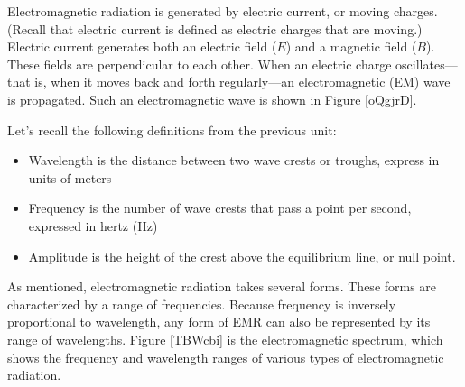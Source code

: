 \documentclass{article}
\numberwithin{equation}{section}
\numberwithin{figure}{section}
\begin{document}
\vspace{1em}

Electromagnetic radiation is generated by electric current, or moving charges. (Recall that electric current is defined as electric charges that are moving.) Electric current generates both an electric field ($E$) and a magnetic field ($B$). These fields are perpendicular to each other. When an electric charge oscillates---that is, when it moves back and forth regularly---an electromagnetic (EM) wave is propagated. Such an electromagnetic wave is shown in Figure \ref{oQgjrD}.

\begin{center}
    \captionsetup{type=figure,margin=1in,font=scriptsize}
    \label{oQgjrD}
\end{center}

Let's recall the following definitions from the previous unit:

\begin{itemize}
\setlength\itemsep{-0.5ex}
    \item Wavelength is the distance between two wave crests or troughs, express in units of meters
    \item Frequency is the number of wave crests that pass a point per second, expressed in hertz (Hz)
    \item Amplitude is the height of the crest above the equilibrium line, or null point.
\end{itemize}

As mentioned, electromagnetic radiation takes several forms. These forms are characterized by a range of frequencies. Because frequency is inversely proportional to wavelength, any form of EMR can also be represented by its range of wavelengths. Figure \ref{TBWcbi} is the electromagnetic spectrum, which shows the frequency and wavelength ranges of various types of electromagnetic radiation.
\end{document}
